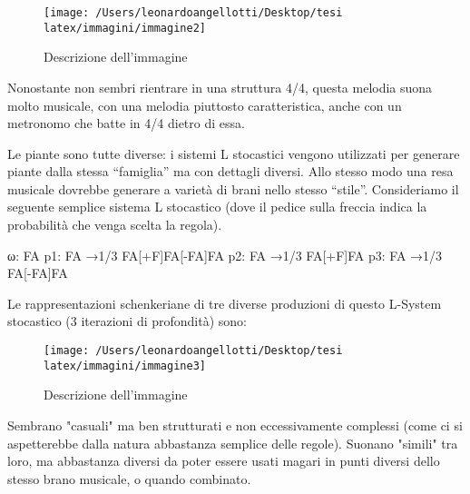 \documentclass[a4paper,12pt]{report}
\begin{document}
\begin{figure}[h!]
    \centering
    \texttt{[image: /Users/leonardoangellotti/Desktop/tesi latex/immagini/immagine2]} 
    \caption{Descrizione dell'immagine}
    \label{fig:immagine}
\end{figure}

Nonostante non sembri rientrare in una struttura 4/4, questa melodia suona molto musicale, con una melodia piuttosto caratteristica, anche con un metronomo che batte in 4/4 dietro di essa.

Le piante sono tutte diverse: i sistemi L stocastici vengono utilizzati per generare piante dalla stessa
“famiglia” ma con dettagli diversi. Allo stesso modo una resa musicale dovrebbe generare a
varietà di brani nello stesso “stile”. Consideriamo il seguente semplice sistema L stocastico
(dove il pedice sulla freccia indica la probabilità che venga scelta la regola).

ω: FA 
p1: FA →1/3 FA[+F]FA[-FA]FA 
p2: FA →1/3 FA[+F]FA 
p3: FA →1/3 FA[-FA]FA

Le rappresentazioni schenkeriane di tre diverse produzioni di questo L-System stocastico (3 iterazioni di profondità) sono:

\begin{figure}[h!]
    \centering
    \texttt{[image: /Users/leonardoangellotti/Desktop/tesi latex/immagini/immagine3]} 
    \caption{Descrizione dell'immagine}
    \label{fig:immagine}
\end{figure}

Sembrano "casuali" ma ben strutturati e non eccessivamente complessi (come ci si aspetterebbe dalla natura abbastanza semplice delle regole). 
Suonano "simili" tra loro, ma abbastanza diversi da poter essere usati magari in punti diversi dello stesso brano musicale, o quando combinato.
\end{document}
